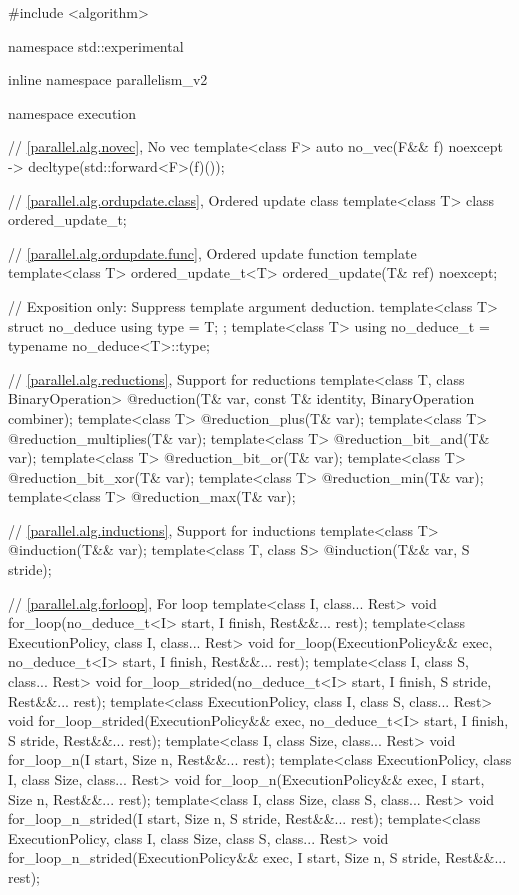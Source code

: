 \begin{codeblock}
#include <algorithm>

namespace std::experimental {
inline namespace parallelism_v2 {
namespace execution {
  // \ref{parallel.alg.novec}, No vec
  template<class F>
    auto no_vec(F&& f) noexcept -> decltype(std::forward<F>(f)());

  // \ref{parallel.alg.ordupdate.class}, Ordered update class
  template<class T>
    class ordered_update_t;

  // \ref{parallel.alg.ordupdate.func}, Ordered update function template
  template<class T>
    ordered_update_t<T> ordered_update(T& ref) noexcept;
}

// Exposition only: Suppress template argument deduction.
template<class T> struct no_deduce { using type = T; };
template<class T> using no_deduce_t = typename no_deduce<T>::type;

// \ref{parallel.alg.reductions}, Support for reductions
template<class T, class BinaryOperation>
  @\unspec@ reduction(T& var, const T& identity, BinaryOperation combiner);
template<class T>
  @\unspec@ reduction_plus(T& var);
template<class T>
  @\unspec@ reduction_multiplies(T& var);
template<class T>
  @\unspec@ reduction_bit_and(T& var);
template<class T>
  @\unspec@ reduction_bit_or(T& var);
template<class T>
  @\unspec@ reduction_bit_xor(T& var);
template<class T>
  @\unspec@ reduction_min(T& var);
template<class T>
  @\unspec@ reduction_max(T& var);

// \ref{parallel.alg.inductions}, Support for inductions
template<class T>
  @\unspec@ induction(T&& var);
template<class T, class S>
  @\unspec@ induction(T&& var, S stride);

// \ref{parallel.alg.forloop}, For loop
template<class I, class... Rest>
  void for_loop(no_deduce_t<I> start, I finish, Rest&&... rest);
template<class ExecutionPolicy,
         class I, class... Rest>
  void for_loop(ExecutionPolicy&& exec,
                no_deduce_t<I> start, I finish, Rest&&... rest);
template<class I, class S, class... Rest>
  void for_loop_strided(no_deduce_t<I> start, I finish,
                        S stride, Rest&&... rest);
template<class ExecutionPolicy,
         class I, class S, class... Rest>
  void for_loop_strided(ExecutionPolicy&& exec,
                        no_deduce_t<I> start, I finish,
                        S stride, Rest&&... rest);
template<class I, class Size, class... Rest>
  void for_loop_n(I start, Size n, Rest&&... rest);
template<class ExecutionPolicy,
         class I, class Size, class... Rest>
  void for_loop_n(ExecutionPolicy&& exec,
                  I start, Size n, Rest&&... rest);
template<class I, class Size, class S, class... Rest>
  void for_loop_n_strided(I start, Size n, S stride, Rest&&... rest);
template<class ExecutionPolicy,
         class I, class Size, class S, class... Rest>
  void for_loop_n_strided(ExecutionPolicy&& exec,
                          I start, Size n, S stride, Rest&&... rest);
}
}
\end{codeblock}

